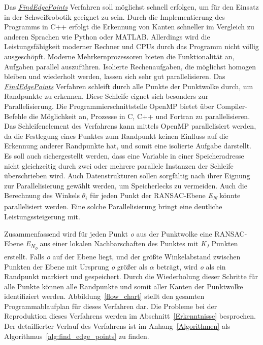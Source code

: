 Das \textit{\hyperref[alg:find_edge_points]{FindEdgePoints}} Verfahren soll möglichst schnell erfolgen, um für den Einsatz in der Schweißrobotik geeignet zu sein. Durch die Implementierung des Programms in C++ erfolgt die Erkennung von Kanten schneller im Vergleich zu anderen Sprachen wie Python oder MATLAB. Allerdings wird die Leistungsfähigkeit moderner Rechner und CPUs durch das Programm nicht völlig ausgeschöpft. Moderne Mehrkernprozessoren bieten die Funktionalität an, Aufgaben parallel auszuführen. Isolierte Rechenaufgaben, die möglichst homogen bleiben und wiederholt werden, lassen sich sehr gut parallelisieren. Das \textit{\hyperref[alg:find_edge_points]{FindEdgePoints}} Verfahren schleift durch alle Punkte der Punktwolke durch, um Randpunkte zu erkennen. Diese Schleife eignet sich besonders zur Parallelisierung. Die Programmierschnittstelle OpenMP bietet über Compiler-Befehle die Möglichkeit an, Prozesse in C, C++ und Fortran zu parallelisieren. Das Schleifenelement des Verfahrens kann mittels OpenMP parallelisiert werden, da die Festlegung eines Punktes zum Randpunkt keinen Einfluss auf die Erkennung anderer Randpunkte hat, und somit eine isolierte Aufgabe darstellt. Es soll auch sichergestellt werden, dass eine Variable in einer Speicheradresse nicht gleichzeitig durch zwei oder mehrere parallele Instanzen der Schleife überschrieben wird. Auch Datenstrukturen sollen sorgfältig nach ihrer Eignung zur Parallelisierung gewählt werden, um Speicherlecks zu vermeiden. Auch die Berechnung des Winkels $\theta_i$ für jeden Punkt der RANSAC-Ebene \textit{E\textsubscript{N}} könnte parallelisiert werden. Eine solche Parallelisierung bringt eine deutliche Leistungssteigerung mit. 

Zusammenfassend wird für jeden Punkt \textit{o} aus der Punktwolke eine RANSAC-Ebene \textit{E\textsubscript{N\textsubscript{o}}} aus einer lokalen Nachbarschaften des Punktes mit \textit{K\textsubscript{1}} Punkten erstellt. Falls \textit{o} auf der Ebene liegt, und der größte Winkelabstand zwischen Punkten der Ebene mit Ursprung \textit{o} größer als $\alpha$ beträgt, wird \textit{o} als ein Randpunkt markiert und gespeichert. Durch die Wiederholung dieser Schritte für alle Punkte können alle Randpunkte und somit aller Kanten der Punktwolke identifiziert werden. Abbildung~\ref{flow_chart} stellt den gesamten Programmablaufplan für dieses Verfahren dar. Die Probleme bei der Reproduktion dieses Verfahrens werden im Abschnitt~\ref{Erkenntnisse} besprochen. Der detaillierter Verlauf des Verfahrens ist im Anhang~\ref{Algorithmen} als Algorithmus~\ref{alg:find_edge_points} zu finden.


